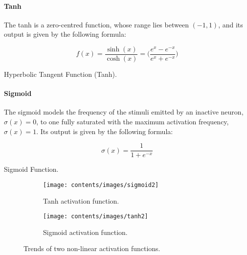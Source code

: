 \paragraph*{Tanh}
The tanh is a zero-centred function, whose range lies between $(-1, 1)$, and its 
output is given by the following formula:
\begin{Equation}[H]
	\centering
	\begin{equation}
	f(x)= \frac{\sinh (x)}{\cosh (x)} = \bigg( \frac{e^x - e^{-x}}{e^x + 
		e^{-x}}\bigg)
	\end{equation}
	\caption{Hyperbolic Tangent Function (Tanh).}
	\label{eq:tanh}
\end{Equation}

\paragraph*{Sigmoid}
The sigmoid models the frequency of the stimuli emitted by an inactive neuron, 
$\sigma(x)=0$, to one fully saturated with the maximum activation frequency, 
$\sigma(x)=1$. Its  output is given by the following formula:
\begin{Equation}[H]
	\centering
	\begin{equation}
	\sigma(x)= \frac{1}{1 + e^{-x}}
	\end{equation}
	\caption{Sigmoid Function.}
	\label{eq:sigmoid}
\end{Equation}

\begin{figure}[!htb]
	\begin{center}
		\begin{subfigure}[h]{0.495\textwidth}
			\texttt{[image: contents/images/sigmoid2]}
			\caption{Tanh activation function.}
		\end{subfigure}
		\hfill
		\begin{subfigure}[h]{0.495\textwidth}
			\texttt{[image: contents/images/tanh2]}
			\caption{Sigmoid activation function.}
		\end{subfigure}
	\end{center}
	\caption{Trends of two non-linear activation functions.}
	\label{fig:activation}
\end{figure}

